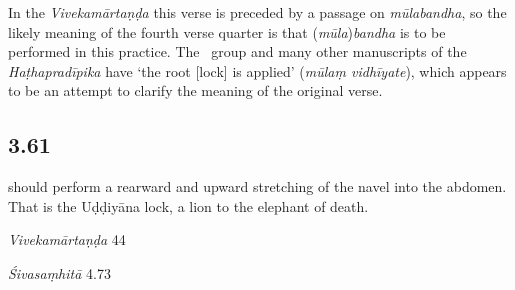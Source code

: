 \begin{ekdosis}
\begin{testimonia}[hp03_060]
\end{testimonia}

\begin{philcomm}[hp03_060]
In the \emph{Vivekamārtaṇḍa} this verse is preceded by a passage on \emph{mūlabandha}, so the likely meaning of the fourth verse quarter is that (\emph{mūla})\emph{bandha} is to be performed in this practice. The \textbeta\ group and many other manuscripts of the \emph{Haṭhapradīpika} have `the root [lock] is applied' (\emph{mūlaṃ vidhīyate}), which appears to be an attempt to clarify the meaning of the original verse.
\end{philcomm}


\subsection*{3.61}
\begin{translation} should perform a rearward and upward stretching of the navel into the abdomen. That is the Uḍḍiyāna lock, a lion to the elephant of death.
\end{translation}

\begin{sources}[hp03_061]
\emph{Vivekamārtaṇḍa} 44
\begin{versinnote}
\end{versinnote}

\emph{Śivasaṃhitā} 4.73
\begin{versinnote}
\end{versinnote}
\end{sources}


\end{ekdosis}
